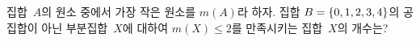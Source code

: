 집합~$A$의 원소 중에서 가장 작은 원소를 $m(A)$라 하자. 집합 $B=\{0{,}\mkern3mu\mathopen{}1{,}\mkern3mu\mathopen{}2{,}\mkern3mu\mathopen{}3{,}\mkern3mu\mathopen{}4\}$의 공집합이 아닌 부분집합~$X$에 대하여 $m(X)\le 2$를 만족시키는 집합~$X$의 개수는?
